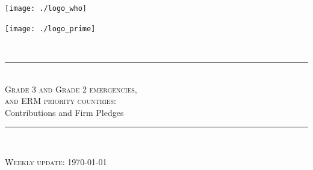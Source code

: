 \documentclass[12pt,a4paper]{article}\usepackage[]{graphicx}\usepackage[]{color}
\newcommand{\HRule}{\rule{\linewidth}{0.5mm}}
\begin{document}
\begin{titlepage}
\begin{center}

\begin{minipage}{0.45\textwidth}
\begin{flushleft}\large
\texttt{[image: ./logo\_who]}~\\[1cm]
\end{flushleft}
\end{minipage}
\hfill
\begin{minipage}{0.45\textwidth}
\begin{flushright}\large
\texttt{[image: ./logo\_prime]}~\\[1cm]
\end{flushright}
\end{minipage}\\[4.0cm]

\HRule \\[0.3cm]
\textsc{\huge Grade 3 and Grade 2 emergencies,}\\[0.4cm]
\textsc{\huge and ERM priority countries:}\\[0.9cm]
{\LARGE Contributions and Firm Pledges}\\[0.2cm]
\HRule\\[1.5cm]
\vfill

\cleanlookdateon
\textsc{\LARGE Weekly update: \today}%

\end{center}
\end{titlepage}
\end{document}
